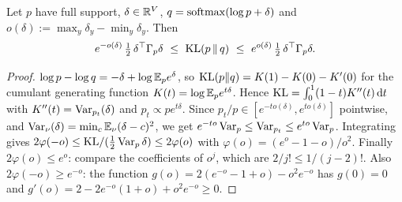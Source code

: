 \begin{lemma}\label{lem:quad}
\Pv\Ck Let $p$ have full support, $\delta\in\mathbb{R}^V$, $q=\operatorname{softmax}(\log p+\delta)$ and
$o(\delta):=\max_y\delta_y-\min_y\delta_y$. Then
\[
e^{-o(\delta)}\,\tfrac12\,\delta^\top\Gamma_p\delta\ \le\ \KL(p\,\|\,q)\ \le\ e^{o(\delta)}\,\tfrac12\,\delta^\top\Gamma_p\delta .
\]
\end{lemma}
\begin{proof}
$\log p-\log q=-\delta+\log\mathbb{E}_pe^{\delta}$, so $\mathrm{KL}(p\|q)=K(1)-K(0)-K'(0)$ for the cumulant generating
function $K(t)=\log\mathbb{E}_pe^{t\delta}$. Hence $\mathrm{KL}=\int_0^1(1-t)K''(t)\,\mathrm{d} t$ with $K''(t)=\operatorname{Var}_{p_t}(\delta)$ and
$p_t\propto pe^{t\delta}$. Since $p_t/p\in[e^{-to(\delta)},e^{to(\delta)}]$ pointwise, and
$\operatorname{Var}_\nu(\delta)=\min_c\mathbb{E}_\nu(\delta-c)^2$, we get $e^{-to}\operatorname{Var}_p\le\operatorname{Var}_{p_t}\le e^{to}\operatorname{Var}_p$. Integrating gives
$2\varphi(-o)\le\mathrm{KL}/(\frac12\operatorname{Var}_p\delta)\le2\varphi(o)$ with $\varphi(o)=(e^o-1-o)/o^2$. Finally
$2\varphi(o)\le e^{o}$: compare the coefficients of $o^j$, which are $2/j!\le1/(j-2)!$. Also
$2\varphi(-o)\ge e^{-o}$: the function $g(o)=2(e^{-o}-1+o)-o^2e^{-o}$ has $g(0)=0$ and
$g'(o)=2-2e^{-o}(1+o)+o^2e^{-o}\ge0$.
\end{proof}

